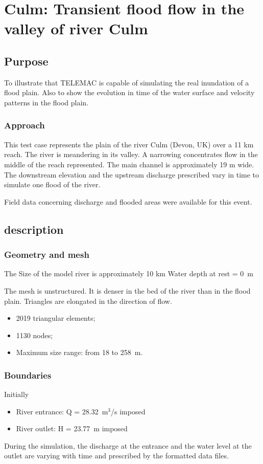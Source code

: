 \chapter{Culm: Transient flood flow in the valley of river Culm}
\section{Purpose}
To illustrate that TELEMAC   is capable of simulating the real
inundation of a flood plain. Also to show the evolution in time of the 
water surface and velocity patterns in the flood plain.

\subsection{Approach}
This test case represents the plain of the river Culm (Devon, UK) over a 11 km
reach. The river is meandering in its valley. A narrowing concentrates
flow in the middle of the reach represented. The main channel is
approximately 19 m wide. The downstream elevation and the upstream discharge
prescribed vary in time to simulate one flood of the river.

Field data concerning discharge and flooded areas were available for this event.

\section{description}

\subsection{Geometry and mesh}

The  Size of the model river is approximately 10 km
Water depth at rest = 0~m

The mesh is unstructured. It is denser in the bed of the river than in the flood plain.
Triangles are elongated in the direction of flow.
\begin{itemize}
\item 2019 triangular elements;
\item 1130 nodes;
\item Maximum size range: from 18 to 258~m.
\end{itemize}

\subsection{Boundaries}
Initially
\begin{itemize}
\item River entrance: Q = 28.32~m$^3$/s imposed
\item  River outlet: H = 23.77~m imposed
 \end{itemize}
During the simulation, the discharge at the entrance and the water level at the outlet are
varying with time and prescribed by the formatted data files.

